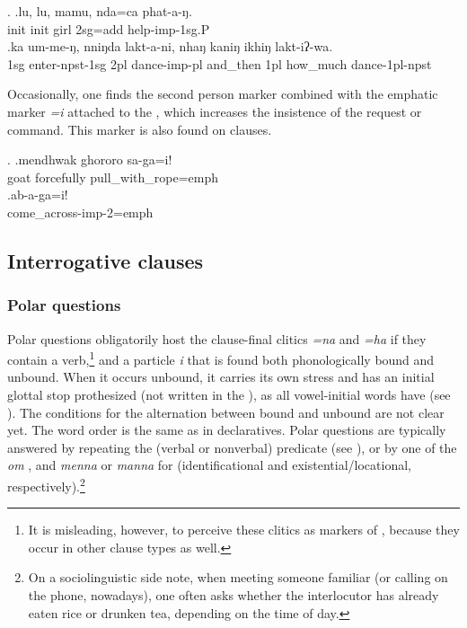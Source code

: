 \ex. \ag.lu,         lu,         mamu, nda=ca        phat-a-ŋ.\\
{\sc init} {\sc init} girl {\sc 2sg=add} help{\sc -imp-1sg.P} \\
 
\bg.ka  um-me-ŋ,            nniŋda lakt-a-ni,           nhaŋ    kaniŋ ikhiŋ   lakt-iʔ-wa.\\
{\sc 1sg} enter{\sc -npst-1sg}  {\sc 2pl} dance{\sc -imp-pl} and\_then {\sc 1pl} how\_much dance{\sc -1pl-npst}\\
 

Occasionally, one finds the second person marker combined with the emphatic marker \emph{=i} attached to the , which increases the insistence  of the request or command. This marker is also found on  clauses.

\ex. \ag.mendhwak ghororo sa-ga=i!\\
goat forcefully pull\_with\_rope{=emph}\\
\bg.ab-a-ga=i!\\
come\_across{\sc -imp-2=emph}\\

\subsection{Interrogative clauses}
  
  
  
\subsubsection{Polar questions}
 
 Polar questions obligatorily host the clause-final clitics \emph{=na} and \emph{=ha} if they contain a verb,\footnote{It is misleading, however, to perceive these clitics as markers of , because they occur in other clause types as well.} and  a particle \emph{i}  that is found both phonologically bound and unbound. When it occurs unbound, it carries its own stress and has an initial glottal stop prothesized (not written in the ), as all  vowel-initial words have (see \Next). The conditions for the alternation between bound and unbound are not clear yet. The word order is the same as in declaratives. Polar questions are typically answered by repeating the (verbal or nonverbal)  predicate (see \NNext), or by one of the  \emph{om} , and \emph{menna} or \emph{manna} for  (identificational and existential/locational, respectively).\footnote{On a sociolinguistic side note, when meeting someone familiar (or calling on the phone, nowadays), one often asks whether the interlocutor has already eaten rice or drunken tea, depending on the time of day.}
 
